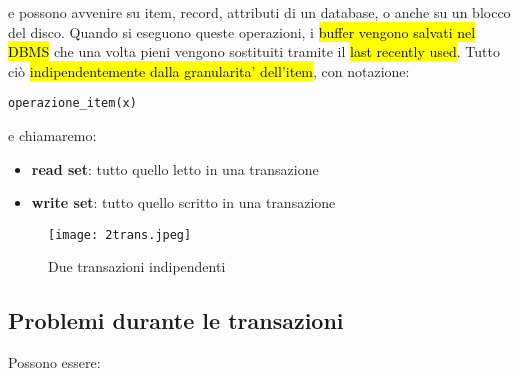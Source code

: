 e possono avvenire su item, record, attributi di un database, o anche su un blocco del disco. Quando si eseguono queste operazioni, i \hl{buffer vengono salvati nel DBMS} che una volta pieni vengono sostituiti tramite il \hl{last recently used}. Tutto ciò \hl{indipendentemente dalla granularita' dell'item}, con notazione:

\begin{lstlisting}
operazione_item(x)
\end{lstlisting}

e chiamaremo:

\begin{itemize}
    \item \textbf{read set}: tutto quello letto in una transazione
    \item \textbf{write set}: tutto quello scritto in una transazione 
\end{itemize}


\begin{figure}[H]
\centering
\texttt{[image: 2trans.jpeg]}
\caption{Due transazioni indipendenti} 
\label{2trans}
\end{figure}


\subsection{Problemi durante le transazioni}

Possono essere:

